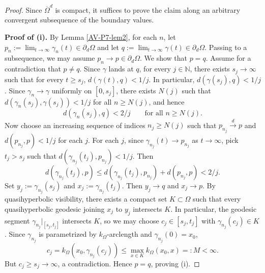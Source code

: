 \documentclass[a4paper,12pt]{amsart}
\theoremstyle{definition}
\begin{document}
\begin{proof}
Since $\overline{\Omega}^d$ is compact, it suffices to prove the claim along an arbitrary convergent subsequence of the boundary values.
	
	\noindent\textbf{Proof of (i).}
By Lemma \ref{AV-P7-lem2}, for each $n$, let $p_n:=\lim_{t\to\infty}\gamma_n(t)\in\partial_d\Omega$ and let $q:=\lim_{t\to\infty}\gamma(t)\in\partial_d\Omega$. Passing to a subsequence, we may assume $p_n\to p\in\partial_d\Omega$. We show that $p=q$. Assume for a contradiction that $p\neq q$. Since $\gamma$ lands at $q$, for every $j\in \mathbb{N}$, there exists $s_j\to \infty$ such that for every $t\ge s_j$, $d(\gamma(t),q)<1/j$. In particular, $d(\gamma(s_j),q)<1/j$. Since $\gamma_n\to\gamma$ uniformly on $[0,s_j]$, there exists $N(j)$ such that
	$d(\gamma_n(s_j),\gamma(s_j))<1/j$ for all $n\ge N(j)$, and hence
	\[
	d(\gamma_n(s_j),q)<2/j\qquad\text{for all }n\ge N(j).
	\]
Now choose an increasing sequence of indices $n_j\ge N(j)$ such that $p_{n_j}\stackrel{d}{\to} p$
and $d(p_{n_j},p)<1/j$ for each $j$. For each $j$, since $\gamma_{n_j}(t)\to p_{n_j}$ as $t\to\infty$, pick $t_j>s_j$ such that
$d(\gamma_{n_j}(t_j),p_{n_j})<1/j$. Then
\[
d(\gamma_{n_j}(t_j),p)\le d(\gamma_{n_j}(t_j),p_{n_j})+d(p_{n_j},p)<2/j.
\]
Set $y_j:=\gamma_{n_j}(s_j)$ and $x_j:=\gamma_{n_j}(t_j)$. Then $y_j\to q$ and $x_j\to p$. By quasihyperbolic visibility, there exists a compact set
$K\subset\Omega$ such that every quasihyperbolic geodesic joining $x_j$ to $y_j$ intersects $K$.
In particular, the geodesic segment $\gamma_{n_j}|_{[s_j,t_j]}$ intersects $K$, so we may choose
$c_j\in[s_j,t_j]$ with $\gamma_{n_j}(c_j)\in K$.
Since $\gamma_{n_j}$ is parametrized by $k_\Omega$-arclength and $\gamma_{n_j}(0)=x_0$,
\[
c_j=k_\Omega(x_0,\gamma_{n_j}(c_j))\le \max_{x\in K}k_\Omega(x_0,x)=:M<\infty.
\]
But $c_j\ge s_j\to\infty$, a contradiction. Hence $p=q$, proving (i).
 

\end{proof}
\end{document}
